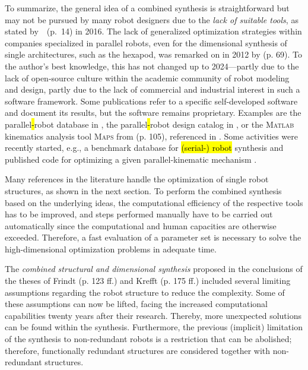 To summarize, the general idea of a combined synthesis is straightforward but may not be pursued by many robot designers due to the \emph{lack of suitable tools}, as stated \mbox{by \cite{Prause2016} (p. 14)} in 2016.
The lack of generalized optimization strategies within companies specialized in parallel robots, even for the dimensional synthesis of single architectures, such as the hexapod, was remarked on in 2012 by \cite{Daake2012} (p. 69).
To the author's best knowledge, this has not changed up to 2024---partly due to the lack of open-source culture within the academic community of robot modeling and design, partly due to the lack of commercial and industrial interest in such a software framework.
Some publications refer to a specific self-developed software and document its results, but the software remains proprietary.
Examples are the parallel\hl{-}robot database in \cite{DingCaoCaiKec2015}, the parallel\hl{-}robot design catalog in \cite{StechertFraVie2010}, or the \textsc{Matlab} kinematics analysis tool \textsc{Maps} from \cite{Frindt2001} (p. 105), referenced in \cite{StechertFraVie2010}.
%
Some activities were recently started, e.g., a benchmark database for \hl{(serial-) robot} %
%
synthesis \cite{MayerKueAlt2022} and published code for optimizing a given parallel-kinematic mechanism \cite{SalunkheMicKumSan2022}.
%

Many references in the literature handle the optimization of single robot structures, as shown in the next section.
To perform the combined synthesis based on the underlying ideas, the computational efficiency of the respective tools has to be improved, and steps performed manually have to be carried out automatically since the computational and human capacities are otherwise exceeded.
Therefore, a fast evaluation of a parameter set is necessary to solve the high-dimensional optimization problems in adequate time.

The \emph{combined structural and dimensional synthesis} proposed in the conclusions of the theses of Frindt \cite{Frindt2001} (p. 123 ff.) %
%
and Krefft \cite{Krefft2006} (p. 175 ff.) included several limiting assumptions regarding the robot structure to reduce the complexity.
Some of these assumptions can now be lifted, facing the increased computational capabilities twenty years after their research.
Thereby, more unexpected solutions can be found within the synthesis.
Furthermore, the previous (implicit) limitation of the synthesis to non-redundant robots is a restriction that can be abolished; therefore, functionally redundant structures are considered together with non-redundant structures.

